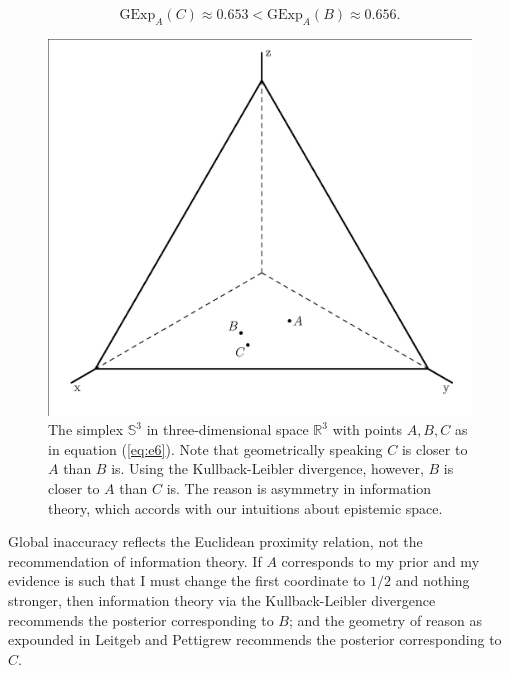 \documentclass[11pt]{article}
\begin{document}
\begin{equation}
  \label{eq:e8a}
  \mbox{GExp}_{A}(C)\approx{}0.653<\mbox{GExp}_{A}(B)\approx{}0.656.
\end{equation}

\begin{figure}[ht]
  \begin{flushright}
    \begin{minipage}[h]{.7\linewidth}
      \includegraphics[width=\textwidth]{threepoints.eps}
      \caption{\footnotesize The simplex $\mathbb{S}^{3}$ in
        three-dimensional space $\mathbb{R}^{3}$ with points $A,B,C$
        as in equation (\ref{eq:e6}). Note that geometrically speaking
        $C$ is closer to $A$ than $B$ is. Using the Kullback-Leibler
        divergence, however, $B$ is closer to $A$ than $C$ is. The
        reason is asymmetry in information theory, which accords with
        our intuitions about epistemic space.}
      \label{fig:threepoints}
    \end{minipage}
  \end{flushright}
\end{figure}

Global inaccuracy reflects the Euclidean proximity relation, not the
recommendation of information theory. If $A$ corresponds to my prior
and my evidence is such that I must change the first coordinate to
$1/2$ and nothing stronger, then information theory via the
Kullback-Leibler divergence recommends the posterior corresponding to
$B$; and the geometry of reason as expounded in Leitgeb and Pettigrew
recommends the posterior corresponding to $C$.
\end{document}
